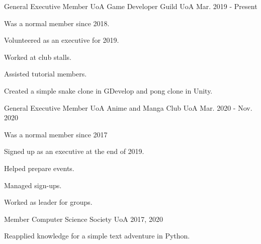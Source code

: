 

\begin{cventries}

\cventry
{General Executive Member} %
{UoA Game Developer Guild} %
{UoA} %
{Mar. 2019 - Present} %
{
  \begin{cvitems} %
    \item {Was a normal member since 2018.}
    \item {Volunteered as an executive for 2019.}
    \item {Worked at club stalls.}
    \item {Assisted tutorial members.}
    \item {Created a simple snake clone in GDevelop and pong clone in Unity.}
  \end{cvitems}
}

  \cventry
    {General Executive Member} %
    {UoA Anime and Manga Club} %
    {UoA} %
    {Mar. 2020 - Nov. 2020} %
    {
      \begin{cvitems} %
        \item {Was a normal member since 2017}
        \item {Signed up as an executive at the end of 2019.}
        \item {Helped prepare events.}
        \item {Managed sign-ups.}
        \item {Worked as leader for groups.}
      \end{cvitems}
    }

  \cventry
    {Member} %
    {Computer Science Society} %
    {UoA} %
    {2017, 2020} %
    {
      \begin{cvitems} %
        \item {Reapplied knowledge for a simple text adventure in Python.}
      \end{cvitems}
    }


\end{cventries}
